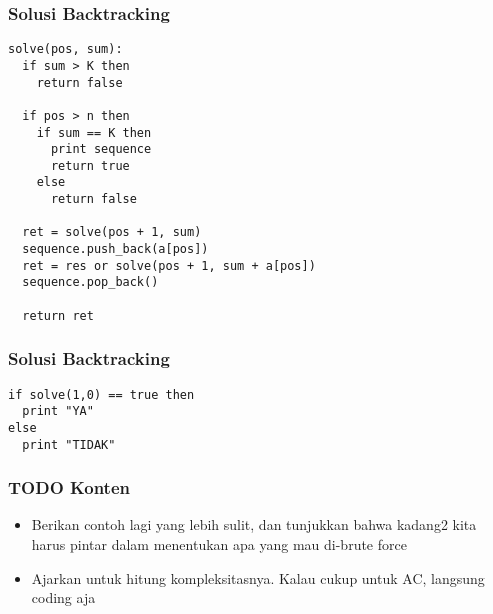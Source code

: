 \begin{frame}[fragile]
\frametitle{Solusi Backtracking}
\begin{lstlisting}
solve(pos, sum):
  if sum > K then
    return false

  if pos > n then
    if sum == K then
      print sequence
      return true
    else
      return false

  ret = solve(pos + 1, sum)
  sequence.push_back(a[pos])
  ret = res or solve(pos + 1, sum + a[pos])
  sequence.pop_back()

  return ret

\end{lstlisting}
\end{frame}

\begin{frame}[fragile]
\frametitle{Solusi Backtracking}
\begin{lstlisting}
if solve(1,0) == true then
  print "YA"
else
  print "TIDAK"
\end{lstlisting}
\end{frame}

\begin{frame}
\frametitle{TODO Konten}
\begin{itemize}
  \item Berikan contoh lagi yang lebih sulit, dan tunjukkan bahwa kadang2 kita harus pintar dalam menentukan apa yang mau di-brute force
  \item Ajarkan untuk hitung kompleksitasnya. Kalau cukup untuk AC, langsung coding aja
\end{itemize}
\end{frame}



